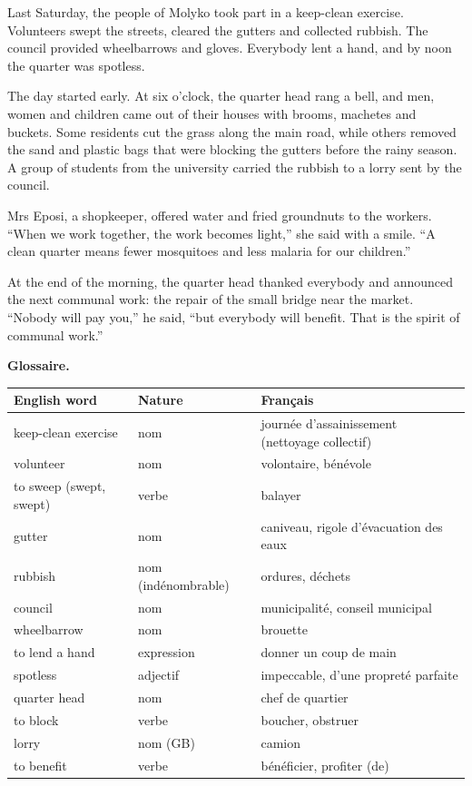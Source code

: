\documentclass[11pt]{article}
\begin{document}
\begin{textebox}
Last Saturday, the people of Molyko took part in a keep-clean exercise. Volunteers swept the streets, cleared the gutters and collected rubbish. The council provided wheelbarrows and gloves. Everybody lent a hand, and by noon the quarter was spotless.

The day started early. At six o'clock, the quarter head rang a bell, and men, women and children came out of their houses with brooms, machetes and buckets. Some residents cut the grass along the main road, while others removed the sand and plastic bags that were blocking the gutters before the rainy season. A group of students from the university carried the rubbish to a lorry sent by the council.

Mrs Eposi, a shopkeeper, offered water and fried groundnuts to the workers. “When we work together, the work becomes light,” she said with a smile. “A clean quarter means fewer mosquitoes and less malaria for our children.”

At the end of the morning, the quarter head thanked everybody and announced the next communal work: the repair of the small bridge near the market. “Nobody will pay you,” he said, “but everybody will benefit. That is the spirit of communal work.”
\end{textebox}

\textbf{Glossaire.}

\begin{center}
\begin{tabularx}{\linewidth}{|l|l|X|}
\hline
\rowcolor{popblueL} \textbf{English word} & \textbf{Nature} & \textbf{Français} \\
\hline
keep-clean exercise & nom & journée d'assainissement (nettoyage collectif) \\
\hline
volunteer & nom & volontaire, bénévole \\
\hline
to sweep (swept, swept) & verbe & balayer \\
\hline
gutter & nom & caniveau, rigole d'évacuation des eaux \\
\hline
rubbish & nom (indénombrable) & ordures, déchets \\
\hline
council & nom & municipalité, conseil municipal \\
\hline
wheelbarrow & nom & brouette \\
\hline
to lend a hand & expression & donner un coup de main \\
\hline
spotless & adjectif & impeccable, d'une propreté parfaite \\
\hline
quarter head & nom & chef de quartier \\
\hline
to block & verbe & boucher, obstruer \\
\hline
lorry & nom (GB) & camion \\
\hline
to benefit & verbe & bénéficier, profiter (de) \\
\hline
\end{tabularx}
\end{center}
\end{document}
